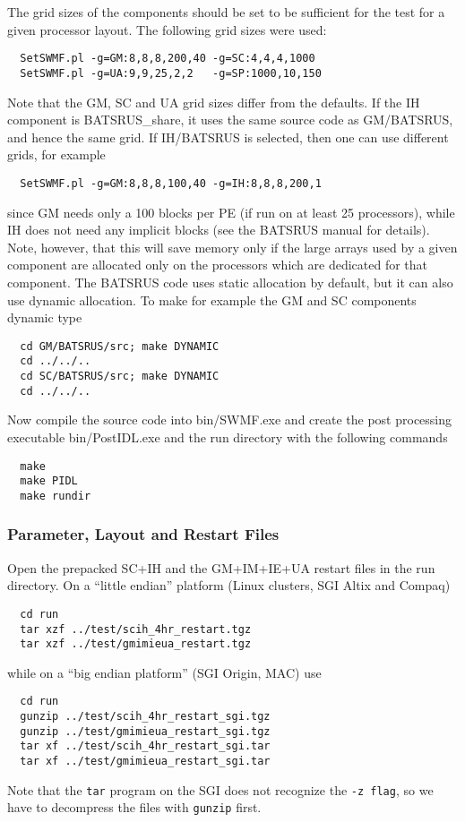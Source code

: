 \documentclass[twoside,10pt]{article}
\begin{document}
The grid sizes of the components should be set to be sufficient for the test
for a given processor layout. The following grid sizes were used:
\begin{verbatim}
  SetSWMF.pl -g=GM:8,8,8,200,40 -g=SC:4,4,4,1000 
  SetSWMF.pl -g=UA:9,9,25,2,2   -g=SP:1000,10,150
\end{verbatim}
Note that the GM, SC and UA grid sizes differ from the defaults.
If the IH component is BATSRUS\_share, it uses the same source
code as GM/BATSRUS, and hence the same grid. If IH/BATSRUS is
selected, then one can use different grids, for example
\begin{verbatim}
  SetSWMF.pl -g=GM:8,8,8,100,40 -g=IH:8,8,8,200,1
\end{verbatim}
since GM needs only a 100 blocks per PE (if run on at least
25 processors), while IH does not need any implicit blocks 
(see the BATSRUS manual for details).
Note, however, that this will save memory only if the large arrays used
by a given component are allocated only on the processors which are dedicated 
for that component. The BATSRUS code uses static allocation by
default, but it can also use dynamic allocation. To make for example
the GM and SC components dynamic type
\begin{verbatim}
  cd GM/BATSRUS/src; make DYNAMIC
  cd ../../..
  cd SC/BATSRUS/src; make DYNAMIC
  cd ../../..
\end{verbatim}
Now compile the source code into bin/SWMF.exe 
and create the post processing executable bin/PostIDL.exe 
and the run directory with the following commands
\begin{verbatim}
  make
  make PIDL
  make rundir
\end{verbatim}

\subsubsection{Parameter, Layout and Restart Files}

Open the prepacked SC+IH and the GM+IM+IE+UA restart files in
the run directory.
On a ``little endian'' platform (Linux clusters, SGI Altix and Compaq)
\begin{verbatim}
  cd run
  tar xzf ../test/scih_4hr_restart.tgz
  tar xzf ../test/gmimieua_restart.tgz
\end{verbatim}
while on a ``big endian platform'' (SGI Origin, MAC) use
\begin{verbatim}
  cd run
  gunzip ../test/scih_4hr_restart_sgi.tgz
  gunzip ../test/gmimieua_restart_sgi.tgz
  tar xf ../test/scih_4hr_restart_sgi.tar
  tar xf ../test/gmimieua_restart_sgi.tar
\end{verbatim}
Note that the {\tt tar} program on the SGI does not recognize the 
{\tt -z flag}, so we have to decompress the files with {\tt gunzip} 
first.
\end{document}
